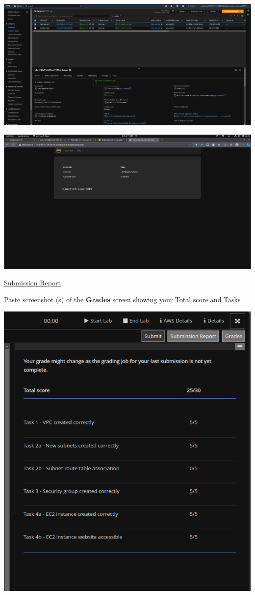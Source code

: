 \documentclass[11pt]{article}
\begin{document}
\begin{enumerate}[resume]
    {\centering
    \includegraphics[width=5.8in]{pics/15a.png}
    }
    

    {\centering
    \includegraphics[width=5.8in]{pics/15b.png}
    }
    
        
\end{enumerate}

\newpage

\noindent\underline{Submission Report}

\vspace{0.5cm}

\noindent Paste screenshot (s) of the \textbf{Grades} screen showing your Total score and Tasks \\
\vspace{5mm}


{\centering
\includegraphics[width=5.8in]{pics/grades.png}
}
\end{document}
